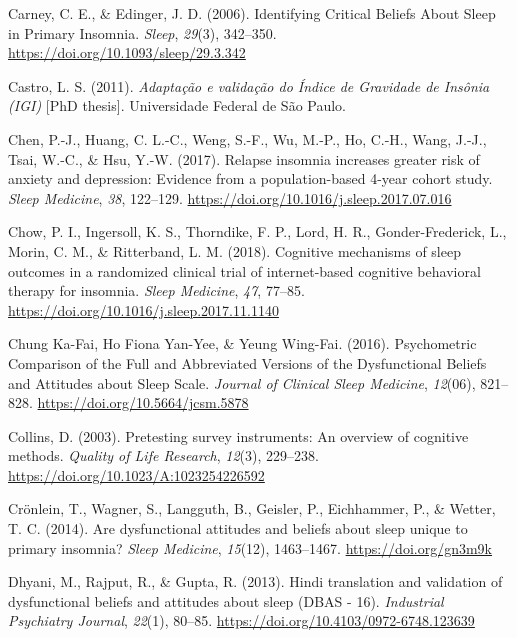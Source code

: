 \documentclass[
  ,doc,11pt, twoside,floatsintext]{apa6}
\newlength{\cslhangindent}
\newlength{\cslentryspacingunit} %
\newenvironment{CSLReferences}[2] %
 {%
  \setlength{\parindent}{0pt}
  \ifodd #1
  \let\oldpar\par
  \def\par{\hangindent=\cslhangindent\oldpar}
  \fi
  \setlength{\parskip}{#2\cslentryspacingunit}
 }%
 {}
\begin{document}
\begin{CSLReferences}{1}{0}
\leavevmode{}%
Carney, C. E., \& Edinger, J. D. (2006). Identifying {Critical Beliefs About Sleep} in {Primary Insomnia}. \emph{Sleep}, \emph{29}(3), 342--350. \url{https://doi.org/10.1093/sleep/29.3.342}

\leavevmode{}%
Castro, L. S. (2011). \emph{Adaptação e validação do {Índice} de {Gravidade} de {Insônia} ({IGI})} {[}PhD thesis{]}. Universidade Federal de São Paulo.

\leavevmode{}%
Chen, P.-J., Huang, C. L.-C., Weng, S.-F., Wu, M.-P., Ho, C.-H., Wang, J.-J., Tsai, W.-C., \& Hsu, Y.-W. (2017). Relapse insomnia increases greater risk of anxiety and depression: Evidence from a population-based 4-year cohort study. \emph{Sleep Medicine}, \emph{38}, 122--129. \url{https://doi.org/10.1016/j.sleep.2017.07.016}

\leavevmode{}%
Chow, P. I., Ingersoll, K. S., Thorndike, F. P., Lord, H. R., Gonder-Frederick, L., Morin, C. M., \& Ritterband, L. M. (2018). Cognitive mechanisms of sleep outcomes in a randomized clinical trial of internet-based cognitive behavioral therapy for insomnia. \emph{Sleep Medicine}, \emph{47}, 77--85. \url{https://doi.org/10.1016/j.sleep.2017.11.1140}

\leavevmode{}%
Chung Ka-Fai, Ho Fiona Yan-Yee, \& Yeung Wing-Fai. (2016). Psychometric {Comparison} of the {Full} and {Abbreviated Versions} of the {Dysfunctional Beliefs} and {Attitudes} about {Sleep Scale}. \emph{Journal of Clinical Sleep Medicine}, \emph{12}(06), 821--828. \url{https://doi.org/10.5664/jcsm.5878}

\leavevmode{}%
Collins, D. (2003). Pretesting survey instruments: {An} overview of cognitive methods. \emph{Quality of Life Research}, \emph{12}(3), 229--238. \url{https://doi.org/10.1023/A:1023254226592}

\leavevmode{}%
Crönlein, T., Wagner, S., Langguth, B., Geisler, P., Eichhammer, P., \& Wetter, T. C. (2014). Are dysfunctional attitudes and beliefs about sleep unique to primary insomnia? \emph{Sleep Medicine}, \emph{15}(12), 1463--1467. \url{https://doi.org/gn3m9k}

\leavevmode{}%
Dhyani, M., Rajput, R., \& Gupta, R. (2013). Hindi translation and validation of dysfunctional beliefs and attitudes about sleep ({DBAS} - 16). \emph{Industrial Psychiatry Journal}, \emph{22}(1), 80--85. \url{https://doi.org/10.4103/0972-6748.123639}


\end{CSLReferences}
\end{document}
